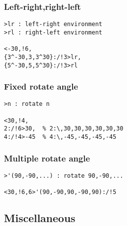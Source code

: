 \documentclass[a4paper]{article}
\begin{document}
\subsubsection{Left-right,right-left}
%
%
\begin{verbatim}
>lr : left-right environment
>rl : right-left environment

<-30,!6,
{3^-30,3,3^30}:/!3>lr,
{5^-30,5,5^30}:/!3>rl
\end{verbatim}
\subsubsection{Fixed rotate angle}
\index{\textgreater}%
\begin{verbatim}
>n : rotate n

<30,!4,
2:/!6>30,  % 2:\,30,30,30,30,30,30
4:/!4>-45  % 4:\,-45,-45,-45,-45

\end{verbatim}
\subsubsection{Multiple rotate angle}
\begin{verbatim}
>'(90,-90,...) : rotate 90,-90,...

<30,!6,6>'(90,-90,90,-90,90):/!5
\end{verbatim}
\newpage
\subsection{Miscellaneous}
\end{document}
